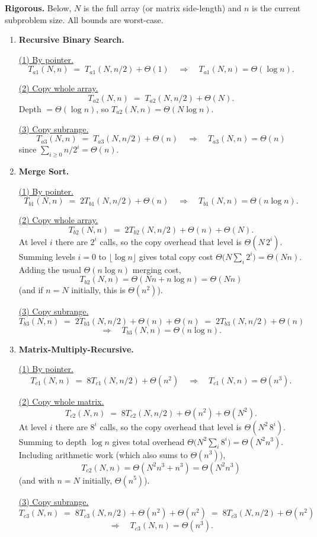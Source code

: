 \documentclass[12pt]{article}
\theoremstyle{definition}
\begin{document}
\medskip
\noindent\textbf{Rigorous.} Below, $N$ is the full array (or matrix side-length) and $n$ is the current subproblem size. All bounds are worst-case.

\begin{enumerate}
\item \textbf{Recursive Binary Search.}

\underline{(1) By pointer.}
\[
T_{a1}(N,n) \;=\; T_{a1}(N,n/2)+\Theta(1) 
\quad\Rightarrow\quad T_{a1}(N,n)=\Theta(\log n).
\]

\underline{(2) Copy whole array.}
\[
T_{a2}(N,n) \;=\; T_{a2}(N,n/2)+\Theta(N).
\]
Depth $=\Theta(\log n)$, so $T_{a2}(N,n)=\Theta(N\log n)$.

\underline{(3) Copy subrange.}
\[
T_{a3}(N,n) \;=\; T_{a3}(N,n/2)+\Theta(n)
\quad\Rightarrow\quad T_{a3}(N,n)=\Theta(n)
\]
since $\sum_{i\ge 0} n/2^i=\Theta(n)$.

\item \textbf{Merge Sort.}

\underline{(1) By pointer.}
\[
T_{b1}(N,n) \;=\; 2T_{b1}(N,n/2)+\Theta(n)
\quad\Rightarrow\quad T_{b1}(N,n)=\Theta(n\log n).
\]

\underline{(2) Copy whole array.}
\[
T_{b2}(N,n) \;=\; 2T_{b2}(N,n/2)+\Theta(n)+\Theta(N).
\]
At level $i$ there are $2^i$ calls, so the copy overhead that level is $\Theta(N\,2^i)$.
Summing levels $i=0$ to $\lfloor\log n\rfloor$ gives total copy cost
$\Theta\!\big(N\sum_i 2^i\big)=\Theta(Nn)$.
Adding the usual $\Theta(n\log n)$ merging cost,
\[
T_{b2}(N,n)=\Theta(Nn+n\log n)=\Theta(Nn)
\]
(and if $n=N$ initially, this is $\Theta(n^2)$).

\underline{(3) Copy subrange.}
\[
T_{b3}(N,n) \;=\; 2T_{b3}(N,n/2) + \Theta(n) + \Theta(n)
\;=\; 2T_{b3}(N,n/2)+\Theta(n)
\]
\[
\Rightarrow\quad T_{b3}(N,n)=\Theta(n\log n).
\]

\item \textbf{Matrix-Multiply-Recursive.}

\underline{(1) By pointer.}
\[
T_{c1}(N,n) \;=\; 8T_{c1}(N,n/2)+\Theta(n^2)
\quad\Rightarrow\quad T_{c1}(N,n)=\Theta(n^3).
\]

\underline{(2) Copy whole matrix.}
\[
T_{c2}(N,n) \;=\; 8T_{c2}(N,n/2)+\Theta(n^2)+\Theta(N^2).
\]
At level $i$ there are $8^i$ calls, so the copy overhead that level is $\Theta(N^2\,8^i)$.
Summing to depth $\log n$ gives total overhead
$\Theta\!\big(N^2\sum_i 8^i\big)=\Theta(N^2 n^3)$.
Including arithmetic work (which also sums to $\Theta(n^3)$),
\[
T_{c2}(N,n)=\Theta(N^2 n^3 + n^3)=\Theta(N^2 n^3)
\]
(and with $n=N$ initially, $\Theta(n^5)$).

\underline{(3) Copy subrange.}
\[
T_{c3}(N,n) \;=\; 8T_{c3}(N,n/2)+\Theta(n^2)+\Theta(n^2)
\;=\; 8T_{c3}(N,n/2)+\Theta(n^2)
\]
\[
\Rightarrow\quad T_{c3}(N,n)=\Theta(n^3).
\]
\end{enumerate}
\end{document}
